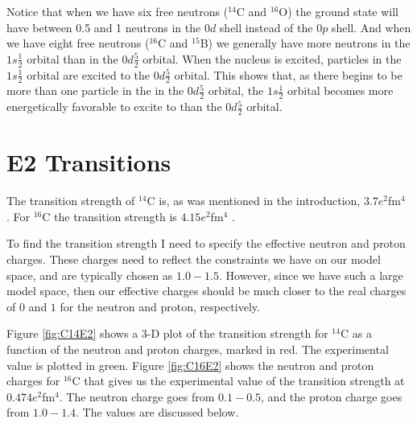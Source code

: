 Notice that when we have six free neutrons ($^{14}$C and $^{16}$O) the ground
state will have between 0.5 and 1 neutrons in the $0d$ shell instead of the
$0p$ shell. And when we have eight free neutrons ($^{16}$C and $^{15}$B) we
generally have more neutrons in the $1s\frac12$ orbital than in the $0d\frac52$
orbital. When the nucleus is excited, particles in the $1s\frac12$ orbital are
excited to the $0d\frac52$ orbital. This shows that, as there begins to be more
than one particle in the in the $0d\frac52$ orbital, the $1s\frac12$ orbital
becomes more energetically favorable to excite to than the $0d\frac52$ orbital.


\section{E2 Transitions}


The transition strength of $^{14}$C is, as was mentioned in the introduction,
$3.7 e^2$fm$^4$ \citep{16CLifetime}. For $^{16}$C the transition strength is
$4.15 e^2$fm$^4$ \citep{16CE2}.  


To find the transition strength I need to specify the effective neutron and
proton charges. These charges need to reflect the constraints we have on our
model space, and are typically chosen as $1.0-1.5$. However, since we have such
a large model space, then our effective charges should be much closer to the
real charges of $0$ and $1$ for the neutron and proton, respectively.

Figure \ref{fig:C14E2} shows a 3-D plot of the transition strength for $^{14}$C
as a function of the neutron and proton charges, marked in red. The
experimental value is plotted in green. Figure \ref{fig:C16E2}
shows the neutron and proton charges for $^{16}$C that gives us the
experimental value of the transition strength at $0.474e^2$fm$^4$. The neutron
charge goes from $0.1-0.5$, and the proton charge goes from $1.0-1.4$. The
values are discussed below.




